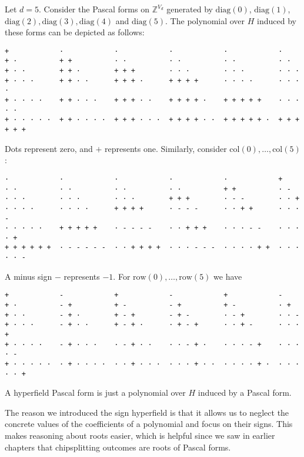 \begin{example}
    Let \( d =5 \). Consider the Pascal forms on \( \mathbb{Z}^{V_d} \) generated by \( \mathrm{diag}(0) \), \(\mathrm{diag}(1)\), \(\mathrm{diag}(2), \mathrm{diag}(3), \mathrm{diag}(4) \) and \( \mathrm{diag}(5) \). The polynomial over \( H \) induced by these forms can be depicted as follows:
    \begin{verbatim}
+            ·            ·            ·            ·            ·
+ ·          + +          · ·          · ·          · ·          · ·
+ · ·        + + ·        + + +        · · ·        · · ·        · · ·
+ · · ·      + + · ·      + + + ·      + + + +      · · · ·      · · · ·
+ · · · ·    + + · · ·    + + + · ·    + + + + ·    + + + + +    · · · · ·
+ · · · · ·  + + · · · ·  + + + · · ·  + + + + · ·  + + + + + ·  + + + + + +
    \end{verbatim}
    Dots represent zero, and \( + \) represents one. Similarly, consider \( \mathrm{col}(0), \dots, \mathrm{col}(5) \):
    \begin{verbatim}
·            ·            ·            ·            ·            +
· ·          · ·          · ·          · ·          + +          · -
· · ·        · · ·        · · ·        + + +        · - -        · · +
· · · ·      · · · ·      + + + +      · - - -      · · + +      · · · -
· · · · ·    + + + + +    · - - - -    · · + + +    · · · - -    · · · · +
+ + + + + +  · - - - - -  · · + + + +  · · · - - -  · · · · + +  · · · · · -
    \end{verbatim}
    A minus sign \( - \) represents \( -1 \). For \( \mathrm{row}(0), \dots, \mathrm{row}(5) \) we have
    \begin{verbatim}
+            -            +            -            +            -
+ ·          - +          + -          - +          + -          · +
+ · ·        - + ·        + - +        - + -        · - +        · · -
+ · · ·      - + · ·      + - + ·      · + - +      · · + -      · · · +
+ · · · ·    - + · · ·    · - + · ·    · · - + ·    · · · - +    · · · · -
+ · · · · ·  · + · · · ·  · · + · · ·  · · · + · ·  · · · · + ·  · · · · · +
    \end{verbatim}
\end{example}

\begin{definition}
    A hyperfield Pascal form is just a polynomial over \( H \) induced by a Pascal form.
\end{definition}

The reason we introduced the sign hyperfield is that it allows us to neglect the concrete values of the coefficients of a polynomial and focus on their signs. This makes reasoning about roots easier, which is helpful since we saw in earlier chapters that chipsplitting outcomes are roots of Pascal forms.

